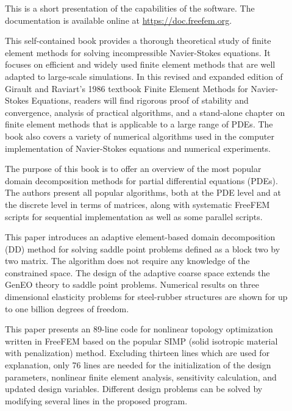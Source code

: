 \begin{description}
\item[] This is a short presentation of the capabilities of the software. The documentation is available online at \url{https://doc.freefem.org}.

\item[] This self-contained book provides a thorough theoretical study of finite element methods for solving incompressible Navier-Stokes equations. It focuses on efficient and widely used finite element methods that are well adapted to large-scale simulations. In this revised and expanded edition of Girault and Raviart's 1986 textbook Finite Element Methods for Navier-Stokes Equations, readers will find rigorous proof of stability and convergence, analysis of practical algorithms, and a stand-alone chapter on finite element methods that is applicable to a large range of PDEs. The book also covers a variety of numerical algorithms used in the computer implementation of Navier-Stokes equations and numerical experiments.

\item[] The purpose of this book is to offer an overview of the most popular domain decomposition methods for partial differential equations (PDEs). The authors present all popular algorithms, both at the PDE level and at the discrete level in terms of matrices, along with systematic FreeFEM scripts for sequential implementation as well as some parallel scripts.

\item[] This paper introduces an adaptive element-based domain decomposition (DD) method for solving saddle point problems defined as a block two by two matrix. The algorithm does not require any knowledge of the constrained space. The design of the adaptive coarse space extends the GenEO theory to saddle point problems. Numerical results on three dimensional elasticity problems for steel-rubber structures are shown for up to one billion degrees of freedom.

\item[] This paper presents an 89-line code for nonlinear topology optimization written in FreeFEM based on the popular SIMP (solid isotropic material with penalization) method. Excluding thirteen lines which are used for explanation, only 76 lines are needed for the initialization of the design parameters, nonlinear finite element analysis, sensitivity calculation, and updated design variables. Different design problems can be solved by modifying several lines in the proposed program.


\end{description}
